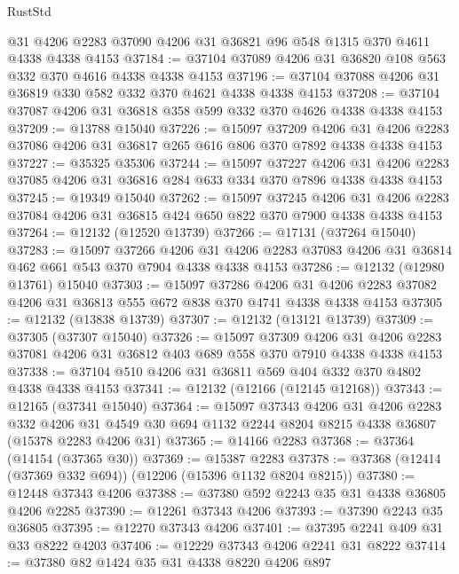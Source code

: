 \begin{lexlean}{RustStd}
\begin{coremodule}
    @31
    @4206
    @2283
    @37090
    @4206
    @31
    @36821
    @96
    @548
    @1315
    @370
    @4611
    @4338
    @4338
    @4153
@37184 := @37104 @37089 @4206 @31 @36820 @108 @563 @332 @370 @4616 @4338 @4338 @4153
@37196 := @37104 @37088 @4206 @31 @36819 @330 @582 @332 @370 @4621 @4338 @4338 @4153
@37208 := @37104 @37087 @4206 @31 @36818 @358 @599 @332 @370 @4626 @4338 @4338 @4153
@37209 := @13788 @15040
@37226 := @15097
    @37209
    @4206
    @31
    @4206
    @2283
    @37086
    @4206
    @31
    @36817
    @265
    @616
    @806
    @370
    @7892
    @4338
    @4338
    @4153
@37227 := @35325 @35306
@37244 := @15097
    @37227
    @4206
    @31
    @4206
    @2283
    @37085
    @4206
    @31
    @36816
    @284
    @633
    @334
    @370
    @7896
    @4338
    @4338
    @4153
@37245 := @19349 @15040
@37262 := @15097
    @37245
    @4206
    @31
    @4206
    @2283
    @37084
    @4206
    @31
    @36815
    @424
    @650
    @822
    @370
    @7900
    @4338
    @4338
    @4153
@37264 := @12132 (@12520 @13739)
@37266 := @17131 (@37264 @15040)
@37283 := @15097
    @37266
    @4206
    @31
    @4206
    @2283
    @37083
    @4206
    @31
    @36814
    @462
    @661
    @543
    @370
    @7904
    @4338
    @4338
    @4153
@37286 := @12132 (@12980 @13761) @15040
@37303 := @15097
    @37286
    @4206
    @31
    @4206
    @2283
    @37082
    @4206
    @31
    @36813
    @555
    @672
    @838
    @370
    @4741
    @4338
    @4338
    @4153
@37305 := @12132 (@13838 @13739)
@37307 := @12132 (@13121 @13739)
@37309 := @37305 (@37307 @15040)
@37326 := @15097
    @37309
    @4206
    @31
    @4206
    @2283
    @37081
    @4206
    @31
    @36812
    @403
    @689
    @558
    @370
    @7910
    @4338
    @4338
    @4153
@37338 := @37104 @510 @4206 @31 @36811 @569 @404 @332 @370 @4802 @4338 @4338 @4153
@37341 := @12132 (@12166 (@12145 @12168))
@37343 := @12165 (@37341 @15040)
@37364 := @15097
    @37343
    @4206
    @31
    @4206
    @2283
    @332
    @4206
    @31
    @4549
    @30
    @694
    @1132
    @2244
    @8204
    @8215
    @4338
    @36807
    (@15378 @2283 @4206 @31)
@37365 := @14166 @2283
@37368 := @37364 (@14154 (@37365 @30))
@37369 := @15387 @2283
@37378 := @37368 (@12414 (@37369 @332 @694)) (@12206 (@15396 @1132 @8204 @8215))
@37380 := @12448 @37343 @4206
@37388 := @37380 @592 @2243 @35 @31 @4338 @36805 @4206 @2285
@37390 := @12261 @37343 @4206
@37393 := @37390 @2243 @35 @36805
@37395 := @12270 @37343 @4206
@37401 := @37395 @2241 @409 @31 @33 @8222 @4203
@37406 := @12229 @37343 @4206 @2241 @31 @8222
@37414 := @37380 @82 @1424 @35 @31 @4338 @8220 @4206 @897

\end{coremodule}
\end{lexlean}
